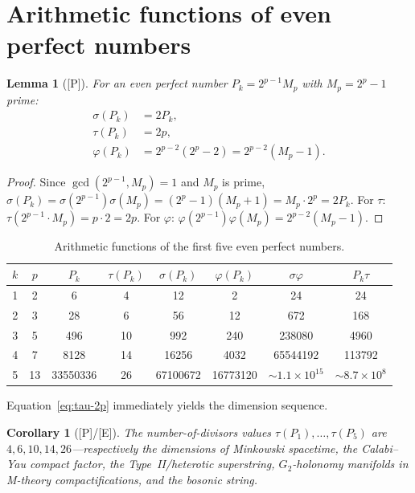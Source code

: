 \documentclass[11pt,letterpaper]{article}
\newtheorem{lemma}[theorem]{Lemma}
\newtheorem{corollary}[theorem]{Corollary}
\theoremstyle{definition}
\theoremstyle{remark}
\newcommand{\proven}{\textsf{[P]}}
\newcommand{\established}{\textsf{[E]}}
\begin{document}
\section{Arithmetic functions of even perfect numbers}
\label{sec:arith}

\begin{lemma}[\proven]\label{lem:arith-vals}
For an even perfect number $P_k = 2^{p-1}M_p$ with $M_p = 2^p-1$ prime:
\begin{align}
\sigma(P_k) &= 2P_k, \\
\tau(P_k) &= 2p, \label{eq:tau-2p}\\
\varphi(P_k) &= 2^{p-2}(2^p - 2) = 2^{p-2}(M_p - 1).
\end{align}
\end{lemma}

\begin{proof}
Since $\gcd(2^{p-1}, M_p) = 1$ and $M_p$ is prime,
$\sigma(P_k) = \sigma(2^{p-1})\sigma(M_p) = (2^p - 1)(M_p + 1) = M_p \cdot 2^p = 2P_k$.
For $\tau$: $\tau(2^{p-1} \cdot M_p) = p \cdot 2 = 2p$.
For $\varphi$: $\varphi(2^{p-1})\varphi(M_p) = 2^{p-2}(M_p - 1)$.
\end{proof}

\begin{table}[ht]
\centering
\caption{Arithmetic functions of the first five even perfect numbers.}
\label{tab:perfect-arith}
\begin{tabular}{@{}cccccccc@{}}
\toprule
$k$ & $p$ & $P_k$ & $\tau(P_k)$ & $\sigma(P_k)$ & $\varphi(P_k)$ & $\sigma\varphi$ & $P_k\tau$ \\
\midrule
1 & 2 & 6 & 4 & 12 & 2 & 24 & 24 \\
2 & 3 & 28 & 6 & 56 & 12 & 672 & 168 \\
3 & 5 & 496 & 10 & 992 & 240 & 238080 & 4960 \\
4 & 7 & 8128 & 14 & 16256 & 4032 & 65544192 & 113792 \\
5 & 13 & 33550336 & 26 & 67100672 & 16773120 & $\sim 1.1\times 10^{15}$ & $\sim 8.7\times 10^{8}$ \\
\bottomrule
\end{tabular}
\end{table}

Equation~\eqref{eq:tau-2p} immediately yields the dimension sequence.

\begin{corollary}[\proven{}/\established]\label{cor:dims}
The number-of-divisors values $\tau(P_1), \ldots, \tau(P_5)$ are
$4, 6, 10, 14, 26$---respectively the dimensions of 
Minkowski spacetime, the Calabi--Yau compact factor, 
the Type~II/heterotic superstring, $G_2$-holonomy manifolds 
in M-theory compactifications, and the bosonic string.
\end{corollary}
\end{document}
